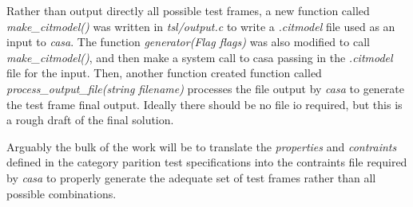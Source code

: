 \documentclass[a4full,12pt]{article}
\begin{document}
Rather than output directly all possible test frames, a new function called
  \emph{make\_citmodel()} was written in \emph{tsl/output.c} to write a 
  \emph{.citmodel} file used as an input to \emph{casa}. The function
  \emph{generator(Flag flags)} was also modified to call \emph{make\_citmodel()},
  and then make a system call to casa passing in the \emph{.citmodel} file for
  the input. Then, another function created function called
  \emph{process\_output\_file(string filename)} processes the file output by
  \emph{casa} to generate the test frame final output. Ideally there should be
  no file io required, but this is a rough draft of the final solution.
  
Arguably the bulk of the work will be to translate the \emph{properties} and 
  \emph{contraints} defined in the category parition test specifications into
  the contraints file required by \emph{casa} to properly generate the adequate
  set of test frames rather than all possible combinations.
\end{document}
